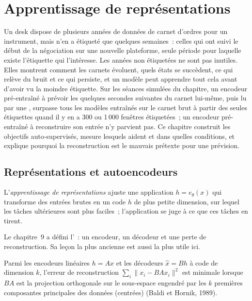 \chapter{Apprentissage de représentations}\label{ch:ml:representation-learning}

Un desk dispose de plusieurs années de données de carnet d'ordres pour un instrument, mais n'en a étiqueté que quelques semaines~: celles qui ont suivi le début de la négociation
sur une nouvelle plateforme, seule période pour laquelle existe l'étiquette qui l'intéresse. Les années non étiquetées ne sont pas inutiles. Elles
montrent comment les carnets évoluent, quels états se succèdent, ce qui relève du bruit et ce qui persiste, et un modèle peut apprendre tout cela avant
d'avoir vu la moindre étiquette. Sur les séances simulées du chapitre, un encodeur pré-entraîné à prévoir les quelques
secondes suivantes du carnet lui-même, puis lu par une , surpasse tous les modèles entraînés sur le carnet brut à partir des seules étiquettes quand il y en a
300 ou 1\,000 fenêtres étiquetées~; un encodeur pré-entraîné à reconstruire son entrée n'y parvient pas. Ce chapitre construit
les objectifs auto-supervisés, mesure lesquels aident et dans quelles conditions, et explique pourquoi la reconstruction est le mauvais prétexte
pour une prévision.

\section{Représentations et autoencodeurs}

\begin{definition}\label{def:ml:representation-learning:representation}
L'\emph{apprentissage de représentations} ajuste une application $h = e_\theta(x)$ qui transforme des entrées brutes en un
code $h$ de plus petite dimension, sur lequel les tâches ultérieures sont plus faciles~; l'application se juge à ce que ces tâches en tirent.
\end{definition}

Le chapitre~9 a défini l'~: un encodeur, un décodeur et une perte de reconstruction. Sa leçon la plus ancienne est aussi la plus
utile ici.

\begin{proposition}\label{prop:ml:represent:pca}
Parmi les encodeurs linéaires $h = Ax$ et les décodeurs $\hat x = Bh$ à code de dimension $k$, l'erreur de reconstruction
$\sum_i\lVert x_i - BAx_i\rVert^2$ est minimale lorsque $BA$ est la projection orthogonale sur le sous-espace engendré par les $k$ premières
composantes principales des données (centrées) (Baldi et Hornik, 1989).
\end{proposition}

